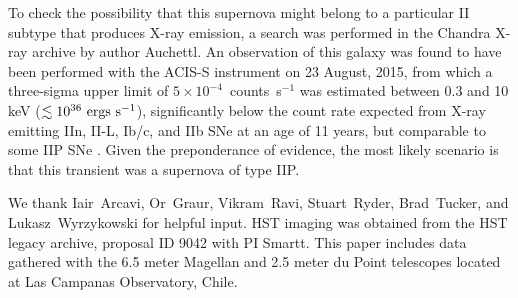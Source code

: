 \documentclass[RNAAS]{aastex62}
\begin{document}
\begin{CJK*}{UTF8}{gbsn}
To check the possibility that this supernova might belong to a particular II subtype that produces X-ray emission, a search was performed in the Chandra X-ray archive by author Auchettl. An observation of this galaxy was found to have been performed with the ACIS-S instrument on 23 August, 2015, from which a three-sigma upper limit of $5 \times 10^{-4}$~counts~s$^{-1}$ was estimated between 0.3 and 10 keV ($\lesssim 10^{36} ~{\rm ergs~s}^{-1}$), significantly below the count rate expected from X-ray emitting IIn, II-L, Ib/c, and IIb SNe at an age of 11 years, but comparable to some IIP SNe \citep{Dwarkadas:2014a,Ross:2017b}. Given the preponderance of evidence, the most likely scenario is that this transient was a supernova of type IIP.

\acknowledgments

We thank Iair~Arcavi, Or~Graur, Vikram~Ravi, Stuart~Ryder, Brad~Tucker, and Lukasz~Wyrzykowski for helpful input. HST imaging was obtained from the HST legacy archive, proposal ID 9042 with PI Smartt. This paper includes data gathered with the 6.5 meter Magellan and 2.5 meter du Point telescopes located at Las Campanas Observatory, Chile.

\vspace{5mm}




\end{CJK*}
\end{document}
